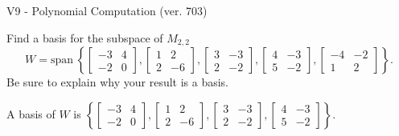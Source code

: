 \begin{exercise}
  \begin{exerciseTitle}V9 - Polynomial Computation (ver. 703)\end{exerciseTitle}
  \begin{exerciseStatement}
    Find a basis for the subspace of \(M_{2,2}\) 
\[W=\mathrm{span}\ \left\{\left[\begin{array}{cc}
-3 & 4 \\
-2 & 0
\end{array}\right] , \left[\begin{array}{cc}
1 & 2 \\
2 & -6
\end{array}\right] , \left[\begin{array}{cc}
3 & -3 \\
2 & -2
\end{array}\right] , \left[\begin{array}{cc}
4 & -3 \\
5 & -2
\end{array}\right] , \left[\begin{array}{cc}
-4 & -2 \\
1 & 2
\end{array}\right]\right\}.\]
 Be sure to explain why your result is a basis.


  \end{exerciseStatement}
  \begin{exerciseAnswer}
   A basis of \(W\) is  \(\left\{\left[\begin{array}{cc}
-3 & 4 \\
-2 & 0
\end{array}\right] , \left[\begin{array}{cc}
1 & 2 \\
2 & -6
\end{array}\right] , \left[\begin{array}{cc}
3 & -3 \\
2 & -2
\end{array}\right] , \left[\begin{array}{cc}
4 & -3 \\
5 & -2
\end{array}\right]\right\}\).
  


  \end{exerciseAnswer}
\end{exercise}